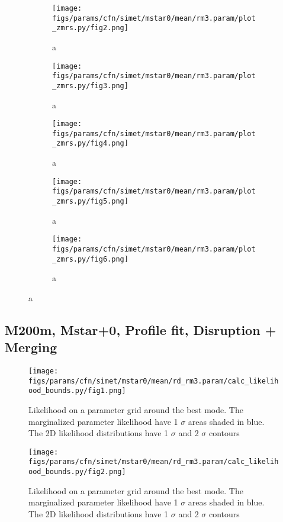 \documentclass[twocolumn]{article}
\begin{document}
\begin{figure}
  \begin{subfigure}{.5\textwidth}
    \centering\texttt{[image: figs/params/cfn/simet/mstar0/mean/rm3.param/plot\_zmrs.py/fig2.png]}
    \caption{a}
  \end{subfigure}
  \begin{subfigure}{.5\textwidth}
    \centering\texttt{[image: figs/params/cfn/simet/mstar0/mean/rm3.param/plot\_zmrs.py/fig3.png]}
    \caption{a}
  \end{subfigure}
  \begin{subfigure}{.5\textwidth}
    \centering\texttt{[image: figs/params/cfn/simet/mstar0/mean/rm3.param/plot\_zmrs.py/fig4.png]}
    \caption{a}
  \end{subfigure}%
  \begin{subfigure}{.5\textwidth}
    \centering\texttt{[image: figs/params/cfn/simet/mstar0/mean/rm3.param/plot\_zmrs.py/fig5.png]}
    \caption{a}
  \end{subfigure}
  \begin{subfigure}{.5\textwidth}
    \centering\texttt{[image: figs/params/cfn/simet/mstar0/mean/rm3.param/plot\_zmrs.py/fig6.png]}
    \caption{a}
  \end{subfigure}
  
\end{figure}
\clearpage


\subsection{M200m, Mstar+0, Profile fit, Disruption + Merging}
\begin{figure}[H]
  \center\texttt{[image: figs/params/cfn/simet/mstar0/mean/rd\_rm3.param/calc\_likelihood\_bounds.py/fig1.png]}
  \caption{Likelihood on a parameter grid around the best mode. The marginalized parameter likelihood have
    1 $\sigma$ areas shaded in blue. The 2D likelihood distributions have 1 $\sigma$  and 2 $\sigma$ contours}
  \label{fig:basic_rd:likelihood}
\end{figure}

\begin{figure}[H]
  \center\texttt{[image: figs/params/cfn/simet/mstar0/mean/rd\_rm3.param/calc\_likelihood\_bounds.py/fig2.png]}
  \caption{Likelihood on a parameter grid around the best mode. The marginalized parameter likelihood have
    1 $\sigma$ areas shaded in blue. The 2D likelihood distributions have 1 $\sigma$  and 2 $\sigma$ contours}
  \label{fig:basic_rd:likelihood}
\end{figure}
\end{document}
